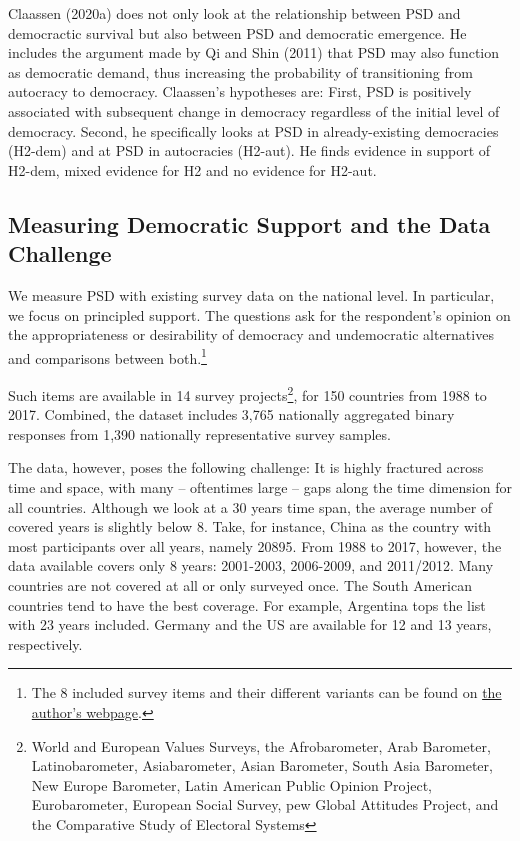 \documentclass[12pt,english,a4paper,oneside]{article}
\theoremstyle{definition}
\theoremstyle{definition}
\theoremstyle{definition}
\theoremstyle{definition}
\theoremstyle{remark}
\begin{document}
Claassen (2020a) does not only look at the relationship between PSD and democractic survival but also between PSD and democratic emergence. He includes the argument made by Qi and Shin (2011) that PSD may also function as democratic demand, thus increasing the probability of transitioning from autocracy to democracy. Claassen's hypotheses are: First, PSD is positively associated with subsequent change in democracy regardless of the initial level of democracy. Second, he specifically looks at PSD in already-existing democracies (H2-dem) and at PSD in autocracies (H2-aut). He finds evidence in support of H2-dem, mixed evidence for H2 and no evidence for H2-aut.

\hypertarget{measuring-democratic-support-and-the-data-challenge}{%
\subsection{Measuring Democratic Support and the Data Challenge}\label{measuring-democratic-support-and-the-data-challenge}}

We measure PSD with existing survey data on the national level. In particular, we focus on principled support. The questions ask for the respondent's opinion on the appropriateness or desirability of democracy and undemocratic alternatives and comparisons between both.\footnote{The 8 included survey items and their different variants can be found on \href{http://chrisclaassen.com/docs/Democratic_mood_supp_materials.pdf}{the author's webpage}.}

Such items are available in 14 survey projects\footnote{World and European Values Surveys, the Afrobarometer, Arab Barometer, Latinobarometer, Asiabarometer, Asian Barometer, South Asia Barometer, New Europe Barometer, Latin American Public Opinion Project, Eurobarometer, European Social Survey, pew Global Attitudes Project, and the Comparative Study of Electoral Systems}, for 150 countries from 1988 to 2017. Combined, the dataset includes 3,765 nationally aggregated binary responses from 1,390 nationally representative survey samples.

The data, however, poses the following challenge: It is highly fractured across time and space, with many -- oftentimes large -- gaps along the time dimension for all countries. Although we look at a 30 years time span, the average number of covered years is slightly below 8. Take, for instance, China as the country with most participants over all years, namely 20895. From 1988 to 2017, however, the data available covers only 8 years: 2001-2003, 2006-2009, and 2011/2012. Many countries are not covered at all or only surveyed once. The South American countries tend to have the best coverage. For example, Argentina tops the list with 23 years included. Germany and the US are available for 12 and 13 years, respectively.
\end{document}
